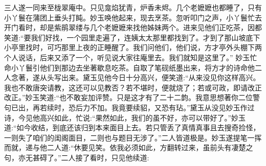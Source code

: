 \begin{parag}
    三人遂一同来至栊翠庵中。只见龛焰犹青，炉香未烬。几个老嬷嬷也都睡了，只有小丫鬟在蒲团上垂头打盹。妙玉唤他起来，现去烹茶。忽听叩门之声，小丫鬟忙去开门看时，却是紫鹃翠缕与几个老嬷嬷来找他姊妹两个。进来见他们正吃茶，因都笑道:“要我们好找，一个园里走遍了，连姨太太那里都找到了。才到了那山坡底下小亭里找时，可巧那里上夜的正睡醒了。我们问他们，他们说，方才亭外头棚下两个人说话，后来又添了一个，听见说大家往庵里去。我们就知是这里了。” 妙玉忙命小丫鬟引他们到那边去坐著歇息吃茶。自取了笔砚纸墨出来，将方才的诗命他二人念著，遂从头写出来。黛玉见他今日十分高兴，便笑道:“从来没见你这样高兴。我也不敢唐突请教，这还可以见教否？若不堪时，便就烧了；若或可政，即请改正改正。”妙玉笑道:“也不敢妄加评赞。只是这才有了二十二韵。我意思想著你二位警句已出，再若续时，恐后力不加。我竟要续貂，又恐有玷。”黛玉从没见妙玉作过诗，今见他高兴如此，忙说:“果然如此，我们的虽不好，亦可以带好了。”妙玉道:“如今收结，到底还该归到本来面目上去。若只管丢了真情真事且去搜奇捡怪，一则失了咱们的闺阁面目，二则也与题目无涉了。”二人皆道极是。妙玉遂提笔一挥而就，递与他二人道:“休要见笑。依我必须如此，方翻转过来，虽前头有凄楚之句，亦无甚碍了。”二人接了看时，只见他续道:
\end{parag}


